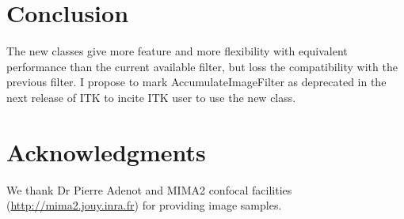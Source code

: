 \documentclass{InsightArticle}
\begin{document}
\section{Conclusion}
The new classes give more feature and more flexibility with equivalent
performance than the current available filter, but loss the compatibility with
the previous filter. I propose to mark AccumulateImageFilter as deprecated in
the next release of ITK to incite ITK user to use the new class.


\section{Acknowledgments}
We thank Dr Pierre Adenot and MIMA2 confocal facilities
(\url{http://mima2.jouy.inra.fr})
for providing image samples.


\appendix





\nocite{ITKSoftwareGuide}
\end{document}
